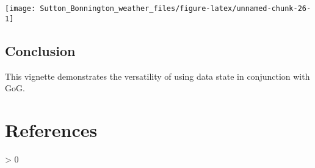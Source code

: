 \documentclass{article}
\newlength{\cslhangindent}
\newenvironment{CSLReferences}[2] %
 {%
  \setlength{\parindent}{0pt}
  \ifodd #1 \everypar{\setlength{\hangindent}{\cslhangindent}}\ignorespaces\fi
  \ifnum #2 > 0
  \setlength{\parskip}{#2\baselineskip}
  \fi
 }%
 {}
\begin{document}
\begin{center}\texttt{[image: Sutton\_Bonnington\_weather\_files/figure-latex/unnamed-chunk-26-1]} \end{center}

\hypertarget{conclusion}{%
\subsection{Conclusion}\label{conclusion}}

This vignette demonstrates the versatility of using data state in conjunction with GoG.

\hypertarget{references}{%
\section*{References}\label{references}}

\hypertarget{refs}{}
\begin{CSLReferences}{0}{0}
\end{CSLReferences}

\let\cleardoublepage\clearpage



\end{document}
